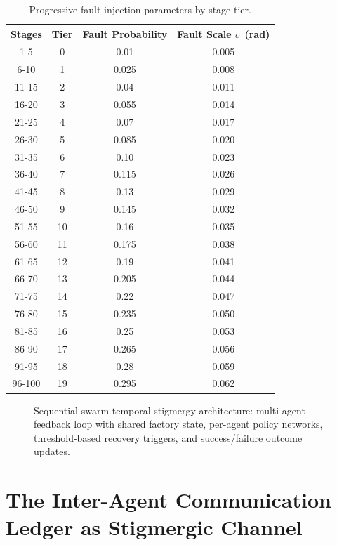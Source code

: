 \documentclass[12pt,a4paper,oneside]{report}
\begin{document}
\begin{table}[H]
\centering
\caption{Progressive fault injection parameters by stage tier.}
\label{tab:fault_tiers}
\begin{tabular}{cccc}
\toprule
\textbf{Stages} & \textbf{Tier} & \textbf{Fault Probability} & \textbf{Fault Scale $\sigma$ (rad)} \\
\midrule
1-5 & 0 & 0.01 & 0.005 \\
6-10 & 1 & 0.025 & 0.008 \\
11-15 & 2 & 0.04 & 0.011 \\
16-20 & 3 & 0.055 & 0.014 \\
21-25 & 4 & 0.07 & 0.017 \\
26-30 & 5 & 0.085 & 0.020 \\
31-35 & 6 & 0.10 & 0.023 \\
36-40 & 7 & 0.115 & 0.026 \\
41-45 & 8 & 0.13 & 0.029 \\
46-50 & 9 & 0.145 & 0.032 \\
51-55 & 10 & 0.16 & 0.035 \\
56-60 & 11 & 0.175 & 0.038 \\
61-65 & 12 & 0.19 & 0.041 \\
66-70 & 13 & 0.205 & 0.044 \\
71-75 & 14 & 0.22 & 0.047 \\
76-80 & 15 & 0.235 & 0.050 \\
81-85 & 16 & 0.25 & 0.053 \\
86-90 & 17 & 0.265 & 0.056 \\
91-95 & 18 & 0.28 & 0.059 \\
96-100 & 19 & 0.295 & 0.062 \\
\bottomrule
\end{tabular}
\end{table}

\begin{figure}[H]
    \centering
    
    \caption{Sequential swarm temporal stigmergy architecture: multi-agent feedback loop with shared factory state, per-agent policy networks, threshold-based recovery triggers, and success/failure outcome updates.}
    \label{fig:swarm_control_loop_flowchart}
\end{figure}

\section{The Inter-Agent Communication Ledger as Stigmergic Channel}
\end{document}
